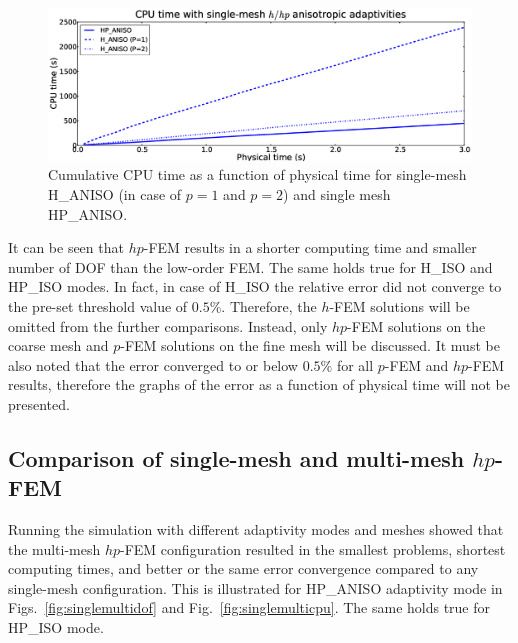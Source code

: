 \begin{figure}[!ht]
  \begin{centering}
  \includegraphics[width=\columnwidth]{singleh_hp_cpu}
  \caption{\label{fig:singlehhpcpu} Cumulative CPU time as a function 
  of physical time for single-mesh H\_ANISO (in case of $p=1$ and $p=2$)
  and single mesh HP\_ANISO.}
  \end{centering}
\end{figure}

\noindent
It can be seen that $hp$-FEM results in a shorter computing 
time and smaller number
of DOF than the low-order FEM. The same holds true
for H\_ISO and HP\_ISO modes. In fact, in case of H\_ISO the relative error did not
converge to the pre-set threshold value of $0.5\%$.
Therefore, the $h$-FEM solutions will be omitted from the further comparisons.
Instead, only $hp$-FEM solutions on the coarse mesh and $p$-FEM solutions
on the fine mesh will be discussed. It must be also noted that the error
converged to or below $0.5\%$ for all $p$-FEM and $hp$-FEM results, therefore
the graphs of the error as a function of physical time will not be presented. 

\subsection{Comparison of single-mesh and multi-mesh $hp$-FEM}

Running the simulation with different adaptivity modes 
and meshes showed that the multi-mesh $hp$-FEM configuration resulted in
the smallest problems, shortest computing times, and better or the same error 
convergence compared to any single-mesh configuration.
This is illustrated for HP\_ANISO adaptivity mode in Figs.~\ref{fig:singlemultidof} 
and Fig.~\ref{fig:singlemulticpu}. The same holds true for HP\_ISO mode. 
 
